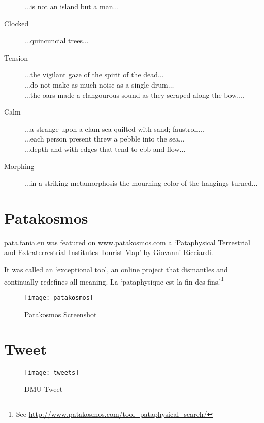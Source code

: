 \begin{description}
                $\ldots$is not an island but a man$\ldots$
  \item [Clocked] $\ldots$quincuncial trees$\ldots$
  \item [Tension] $\ldots$the vigilant gaze of the spirit of the dead$\ldots$\\
                    $\ldots$do not make as much noise as a single drum$\ldots$\\
                    $\ldots$the oars made a clangourous sound as they scraped along the bow$\ldots$.
  \item [Calm] $\ldots$a strange upon a clam sea quilted with sand; faustroll$\ldots$\\
                  $\ldots$each person present threw a pebble into the sea$\ldots$\\
                  $\ldots$depth and with edges that tend to ebb and flow$\ldots$
  \item [Morphing] $\ldots$in a striking metamorphosis the mourning color of the hangings turned$\ldots$
\end{description}

\spirals




\section{Patakosmos}

\url{pata.fania.eu} was featured on \url{www.patakosmos.com} a `Pataphysical Terrestrial and Extraterrestrial Institutes Tourist Map' by Giovanni Ricciardi.

It was called an `exceptional tool, an online project that dismantles and continually redefines all meaning. La ‘pataphysique est la fin des fins.'\footnote{See \url{http://www.patakosmos.com/tool_pataphysical_search/}}

\begin{figure}[h!]
  \centering
  \texttt{[image: patakosmos]}
\caption[Patakosmos Screenshot]{Patakosmos Screenshot}
\label{fig:patakosmos}
\end{figure}


\section{Tweet}

\begin{figure}[h!]
  \centering
  \texttt{[image: tweets]}
\caption[DMU Tweet]{DMU Tweet}
\label{fig:tweet}
\end{figure}



\stopcontents[chapters]
